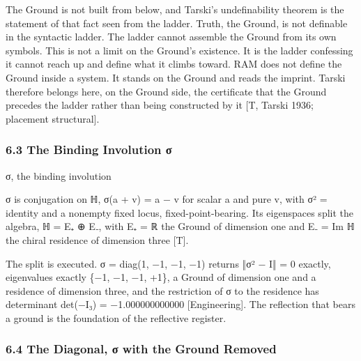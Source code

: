 \documentclass[10pt,twocolumn]{article}
\begin{document}
The Ground is not built from below, and Tarski's undefinability theorem
is the statement of that fact seen from the ladder. Truth, the Ground,
is not definable in the syntactic ladder. The ladder cannot assemble the
Ground from its own symbols. This is not a limit on the Ground's
existence. It is the ladder confessing it cannot reach up and define
what it climbs toward. RAM does not define the Ground inside a system.
It stands on the Ground and reads the imprint. Tarski therefore belongs
here, on the Ground side, the certificate that the Ground precedes the
ladder rather than being constructed by it {[}T, Tarski 1936; placement
structural{]}.

\hypertarget{the-binding-involution-ux3c3}{%
\subsubsection{6.3 The Binding Involution
σ}\label{the-binding-involution-ux3c3}}

\begin{jbox}{σ, the binding involution}

σ is conjugation on ℍ, σ(a + v) = a − v for scalar a and pure v, with σ²
= identity and a nonempty fixed locus, fixed-point-bearing. Its
eigenspaces split the algebra, ℍ = E₊ ⊕ E₋, with E₊ = ℝ the Ground of
dimension one and E₋ = Im ℍ the chiral residence of dimension three
{[}T{]}.

\end{jbox}

The split is executed. σ = diag(1, −1, −1, −1) returns ‖σ² − I‖ = 0
exactly, eigenvalues exactly \{−1, −1, −1, +1\}, a Ground of dimension
one and a residence of dimension three, and the restriction of σ to the
residence has determinant det(−I₃) = −1.000000000000 {[}Engineering{]}.
The reflection that bears a ground is the foundation of the reflective
register.

\hypertarget{the-diagonal-ux3c3-with-the-ground-removed}{%
\subsubsection{6.4 The Diagonal, σ with the Ground
Removed}\label{the-diagonal-ux3c3-with-the-ground-removed}}
\end{document}
